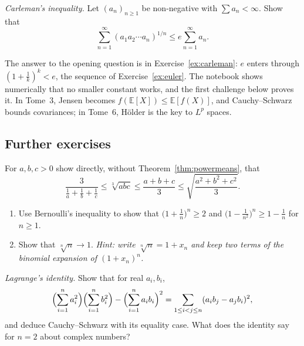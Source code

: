 \begin{exercise}[$\star\star\star$]\label{ex:carleman}
\emph{Carleman's inequality.} Let $(a_n)_{n\ge1}$ be non-negative with $\sum a_n<\infty$. Show that
\[
\sum_{n=1}^\infty\left(a_1a_2\cdots a_n\right)^{1/n}\le e\sum_{n=1}^\infty a_n.
\]
\end{exercise}

\begin{beauty}
The answer to the opening question is in Exercise~\ref{ex:carleman}: $e$ enters through $\left(1+\frac1k\right)^k<e$, the sequence of
Exercise~\ref{ex:euler}. The notebook shows numerically that no smaller constant works, and the first challenge below proves it. In Tome~3, Jensen becomes
$f(\mathbb E[X])\le\mathbb E[f(X)]$, and Cauchy--Schwarz bounds covariances; in Tome~6, H\"older is the key to $L^p$ spaces.
\end{beauty}

\subsection*{Further exercises}

\begin{exercise}[$\star$]\label{ex:means3}
For $a,b,c>0$ show directly, without Theorem~\ref{thm:powermeans}, that
\[
\frac3{\frac1a+\frac1b+\frac1c}\le\sqrt[3]{abc}\le\frac{a+b+c}3\le\sqrt{\frac{a^2+b^2+c^2}3}.
\]
\end{exercise}

\begin{exercise}[$\star$]\label{ex:bernoulli}
\begin{enumerate}[label=(\alph*)]
\item Use Bernoulli's inequality to show that $\bigl(1+\frac1n\bigr)^n\ge2$ and $\bigl(1-\frac1{n^2}\bigr)^n\ge1-\frac1n$ for $n\ge1$.
\item Show that $\sqrt[n]n\to1$. \emph{Hint: write $\sqrt[n]n=1+x_n$ and keep two terms of the binomial expansion of $(1+x_n)^n$.}
\end{enumerate}
\end{exercise}

\begin{exercise}[$\star\star$]\label{ex:lagrangeid}
\emph{Lagrange's identity.} Show that for real $a_i,b_i$,
\[
\Bigl(\sum_{i=1}^na_i^2\Bigr)\Bigl(\sum_{i=1}^nb_i^2\Bigr)-\Bigl(\sum_{i=1}^na_ib_i\Bigr)^2=\sum_{1\le i<j\le n}(a_ib_j-a_jb_i)^2,
\]
and deduce Cauchy--Schwarz with its equality case. What does the identity say for $n=2$ about complex numbers?
\end{exercise}


